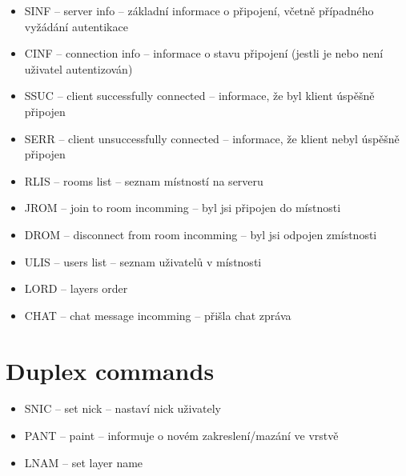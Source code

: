 \begin{itemize}
    \item SINF -- server info -- základní informace o připojení, včetně případného vyžádání autentikace
    \item CINF -- connection info -- informace o stavu připojení (jestli je nebo není uživatel autentizován)
    \item SSUC -- client successfully connected -- informace, že byl klient úspěšně připojen
    \item SERR -- client unsuccessfully connected -- informace, že klient nebyl úspěšně připojen
    \item RLIS -- rooms list -- seznam místností na serveru
    \item JROM -- join to room incomming -- byl jsi připojen do místnosti
    \item DROM -- disconnect from room incomming -- byl jsi odpojen zmístnosti
    \item ULIS -- users list -- seznam uživatelů v místnosti
	\item LORD -- layers order
	\item CHAT -- chat message incomming -- přišla chat zpráva
\end{itemize}

\section{Duplex commands}

\begin{itemize}
    \item SNIC -- set nick -- nastaví nick uživately

	\item PANT -- paint -- informuje o novém zakreslení/mazání ve vrstvě 
	\item LNAM -- set layer name
\end{itemize}







